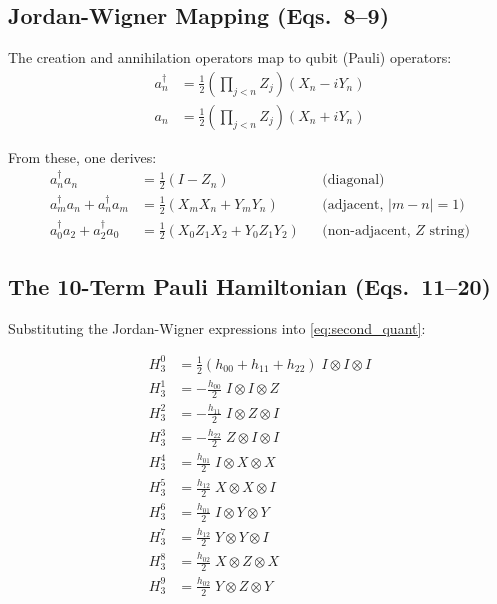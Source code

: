 \documentclass[11pt,a4paper]{article}
\begin{document}
\subsection{Jordan-Wigner Mapping (Eqs.~8--9)}

The creation and annihilation operators map to qubit (Pauli) operators:
\begin{align}
  a_n^\dagger &= \frac{1}{2}\left(\prod_{j<n} Z_j\right)(X_n - iY_n) \label{eq:jw_create}\\
  a_n &= \frac{1}{2}\left(\prod_{j<n} Z_j\right)(X_n + iY_n) \label{eq:jw_destroy}
\end{align}

From these, one derives:
\begin{align}
  a_n^\dagger a_n &= \frac{1}{2}(I - Z_n)
    & &\text{(diagonal)} \label{eq:jw_diag}\\
  a_m^\dagger a_n + a_n^\dagger a_m &= \frac{1}{2}(X_m X_n + Y_m Y_n)
    & &\text{(adjacent, $|m-n|=1$)} \label{eq:jw_adj}\\
  a_0^\dagger a_2 + a_2^\dagger a_0 &= \frac{1}{2}(X_0 Z_1 X_2 + Y_0 Z_1 Y_2)
    & &\text{(non-adjacent, $Z$ string)} \label{eq:jw_nonadj}
\end{align}

\subsection{The 10-Term Pauli Hamiltonian (Eqs.~11--20)}

Substituting the Jordan-Wigner expressions into \eqref{eq:second_quant}:

\begin{align}
  H_3^0 &= \frac{1}{2}(h_{00} + h_{11} + h_{22})\; I \otimes I \otimes I
    \label{eq:H0}\\[4pt]
  H_3^1 &= -\frac{h_{00}}{2}\; I \otimes I \otimes Z
    \label{eq:H1}\\
  H_3^2 &= -\frac{h_{11}}{2}\; I \otimes Z \otimes I
    \label{eq:H2}\\
  H_3^3 &= -\frac{h_{22}}{2}\; Z \otimes I \otimes I
    \label{eq:H3}\\[4pt]
  H_3^4 &= \frac{h_{01}}{2}\; I \otimes X \otimes X
    \label{eq:H4}\\
  H_3^5 &= \frac{h_{12}}{2}\; X \otimes X \otimes I
    \label{eq:H5}\\
  H_3^6 &= \frac{h_{01}}{2}\; I \otimes Y \otimes Y
    \label{eq:H6}\\
  H_3^7 &= \frac{h_{12}}{2}\; Y \otimes Y \otimes I
    \label{eq:H7}\\[4pt]
  H_3^8 &= \frac{h_{02}}{2}\; X \otimes Z \otimes X
    \label{eq:H8}\\
  H_3^9 &= \frac{h_{02}}{2}\; Y \otimes Z \otimes Y
    \label{eq:H9}
\end{align}
\end{document}
